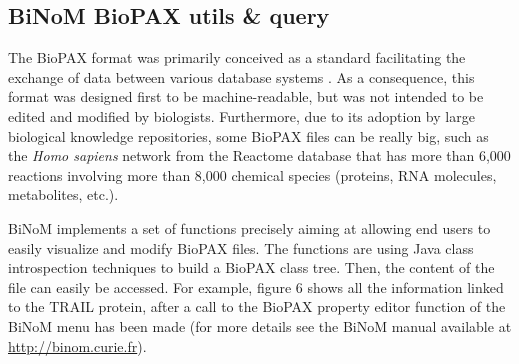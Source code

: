 \documentclass[10pt]{bmc_article}
\newenvironment{bmcformat}{\baselineskip20pt\sloppy\setboolean{publ}{false}}{\baselineskip20pt\sloppy}
\begin{document}
\begin{bmcformat}

\subsection*{BiNoM BioPAX utils \& query}
The BioPAX format was primarily conceived as a standard facilitating the
exchange of data between various database systems \cite{demir2010biopax}. As a
consequence, this format was designed first to be machine-readable, but was not
intended
to be edited and modified by biologists. Furthermore, due to its adoption by
large biological knowledge repositories, some BioPAX files can be really big,
such as the \textit{Homo sapiens} network from the Reactome database
\cite{joshi2005reactome} that has more than 6,000 reactions involving more than
8,000 chemical species (proteins, RNA molecules, metabolites, etc.).

BiNoM implements a set of functions precisely aiming at allowing end users to
easily visualize and modify BioPAX files. The functions are using
Java class introspection techniques to build a BioPAX class tree. Then, the
content of the file can easily be accessed. For example, figure 6 shows
all the information linked to the TRAIL protein, after a call to the
BioPAX property
editor function of the BiNoM menu has been made (for more details see the BiNoM manual available at \url{http://binom.curie.fr}).




\end{bmcformat}
\end{document}
